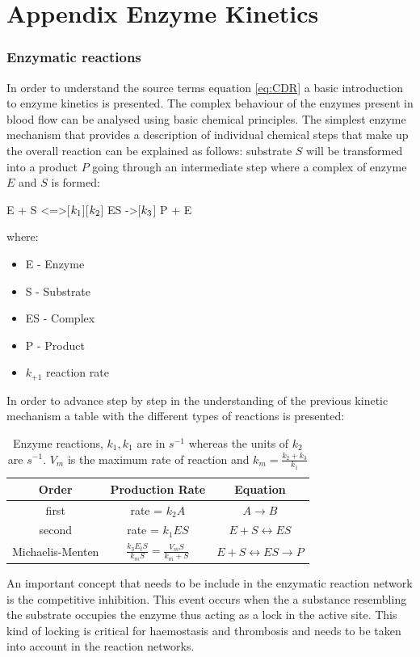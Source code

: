 \documentclass[%
 nofootinbib,
 amsmath,amssymb,
 aps,
 pra,
]{revtex4-1}
\begin{document}
\section{Appendix Enzyme Kinetics}
\subsubsection{Enzymatic reactions}
In order to understand the source terms equation \ref{eq:CDR} a basic introduction to enzyme kinetics is presented. The complex behaviour of the enzymes present in blood flow can be analysed using basic chemical principles. The simplest enzyme mechanism that provides a description of individual chemical steps that make up the overall reaction can be explained as follows: substrate $S$ will be transformed into a product $P$ going through an intermediate step where a complex of enzyme $E$ and $S$ is formed: 
\begin{reaction}
E + S <=>[$k\sb{1}$][$k\sb{2}$] ES ->[$k\sb{3}$] P + E
\end{reaction}
where:
\begin{itemize}
\item E - Enzyme 
\item S - Substrate
\item ES - Complex
\item P - Product
\item $k_{+1}$ reaction rate 
\end{itemize}
In order to advance step by step in the understanding of the previous kinetic mechanism a table with the different types of reactions is presented:\\
\begin{table}[h]
\begin{tabular}{c c c}
\hline
\textbf{Order} & \textbf{Production Rate} & \textbf{Equation} \\
\hline
first & rate = $k_{2} A  $ & $A \rightarrow B$ \\
second & rate = $k_{1} E S$ & $E + S \leftrightarrow ES $\\
Michaelis-Menten & $ \frac{k_{3} E_{t} S }{k_{m} S} = \frac{V_{m} S}{k_{m} + S} $ & $E + S \leftrightarrow ES \rightarrow P  $ \\
\hline  
\end{tabular}\caption{\label{tab:Enzyme} Enzyme reactions, $ k_{1}, k_{1}$ are in $s^{-1}$ whereas the units of $k_{2}$ are $s^{-1}$. $V_{m}$ is the maximum rate of reaction and $k_{m} = \frac{k_{2} + k_{3} }{k_{1}} $}
\end{table}

An important concept that needs to be include in the enzymatic reaction network is the competitive inhibition. This event occurs when the a substance resembling the substrate occupies the enzyme thus acting as a lock in the active site. This kind of locking is critical for haemostasis and thrombosis and needs to be taken into account in the reaction networks.\\

\end{document}
